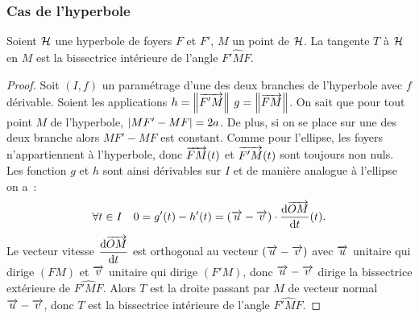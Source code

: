 \subsubsection{Cas de l'hyperbole}
\begin{prop}
  Soient $\mathcal{H}$ une hyperbole de foyers $F$ et $F'$, $M$ un point de $\mathcal{H}$. La tangente $T$ à $\mathcal{H}$ en $M$ est la bissectrice intérieure de l'angle $\widehat{F'MF}$.
\end{prop}
\begin{proof}
  Soit $(I,f)$ un paramétrage d'une des deux branches de l'hyperbole avec $f$ dérivable. Soient les applications $h=\left\lVert\overrightarrow{F'M}\right\rVert$ $g=\left\lVert\overrightarrow{FM}\right\rVert$. On sait que pour tout point $M$ de l'hyperbole, $\left\lvert MF'-MF\right\rvert=2a$. De plus, si on se place sur une des deux branche alors $MF'-MF$ est constant. Comme pour l'ellipse, les foyers n'appartiennent à l'hyperbole, donc $\overrightarrow{FM}(t)$ et $\overrightarrow{F'M}(t)$ sont toujours non nuls. Les fonction $g$ et $h$ sont ainsi dérivables sur $I$ et de manière analogue à l'ellipse on a~:
\begin{equation}
\forall t \in I \quad 0=g'(t)-h'(t)=(\overrightarrow{u}-\overrightarrow{v})\cdot \dfrac{\mathrm{d} \overrightarrow{OM}}{\mathrm{d} t}(t).
\end{equation}
 Le vecteur vitesse $\dfrac{\mathrm{d} \overrightarrow{OM}}{\mathrm{d} t}$ est orthogonal au vecteur $(\overrightarrow{u}-\overrightarrow{v})$ avec $\overrightarrow{u}$ unitaire qui dirige $(FM)$ et $\overrightarrow{v}$ unitaire qui dirige $(F'M)$, donc $\overrightarrow{u}-\overrightarrow{v}$ dirige la bissectrice extérieure de $\widehat{F'MF}$. Alors $T$ est la droite passant par $M$ de vecteur normal $\overrightarrow{u}-\overrightarrow{v}$, donc $T$ est la bissectrice intérieure de l'angle $\widehat{F'MF}$.
\end{proof}
